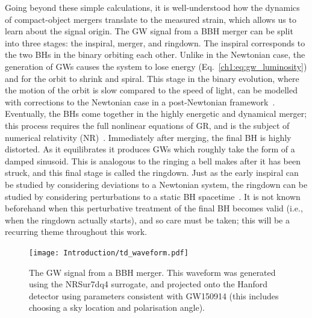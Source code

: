 Going beyond these simple calculations, it is well-understood how the dynamics of compact-object mergers translate to the measured strain, which allows us to learn about the signal origin.
The GW signal from a BBH merger can be split into three stages: the inspiral, merger, and ringdown.
The inspiral corresponds to the two BHs in the binary orbiting each other. 
Unlike in the Newtonian case, the generation of GWs causes the system to lose energy (Eq.~\ref{ch1:eq:gw_luminosity}) and for the orbit to shrink and spiral. 
This stage in the binary evolution, where the motion of the orbit is slow compared to the speed of light, can be modelled with corrections to the Newtonian case in a post-Newtonian framework~\cite{Blanchet:2013haa}. 
Eventually, the BHs come together in the highly energetic and dynamical merger; this process requires the full nonlinear equations of GR, and is the subject of numerical relativity (NR)~\cite{Duez:2018jaf}. 
Immediately after merging, the final BH is highly distorted. 
As it equilibrates it produces GWs which roughly take the form of a damped sinusoid. 
This is analogous to the ringing a bell makes after it has been struck, and this final stage is called the ringdown.
Just as the early inspiral can be studied by considering deviations to a Newtonian system, the ringdown can be studied by considering perturbations to a static BH spacetime~\cite{Sasaki:2003xr, Pound:2021qin}. 
It is not known beforehand when this perturbative treatment of the final BH becomes valid (i.e., when the ringdown actually starts), and so care must be taken; this will be a recurring theme throughout this work.

\begin{figure}
    \centering
    \texttt{[image: Introduction/td\_waveform.pdf]}
    \caption[Time-domain gravitational-wave signal from a binary black-hole merger]{ 
    The GW signal from a BBH merger. 
    This waveform was generated using the NRSur7dq4 surrogate, and projected onto the Hanford detector using parameters consistent with GW150914 (this includes choosing a sky location and polarisation angle).
    }
    \label{ch1:fig:td_waveform}
\end{figure}

